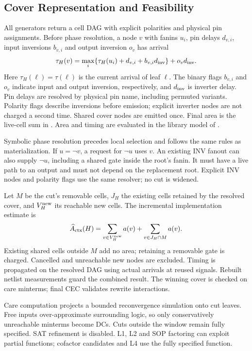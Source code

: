 \subsection{Cover Representation and Feasibility}
All generators return a cell DAG with explicit polarities and physical pin assignments. Before phase resolution, a node $v$ with fanins $u_i$, pin delays $d_{v,i}$, input inversions $b_{v,i}$ and output inversion $o_v$ has arrival
\begin{equation}
 \tau_H(v)=\max_i\{\tau_H(u_i)+d_{v,i}+b_{v,i}d_{\rm inv}\}
                  +o_vd_{\rm inv}.\label{eq:delay}
\end{equation}
Here $\tau_H(\ell)=\tau(\ell)$ is the current arrival of leaf $\ell$. The binary flags $b_{v,i}$ and $o_v$ indicate input and output inversion, respectively, and $d_{\rm inv}$ is inverter delay. Pin delays are resolved by physical pin name, including permuted variants. Polarity flags describe inversions before emission; explicit inverter nodes are not charged a second time. Shared cover nodes are emitted once. Final area is the live-cell sum in . Area and timing are evaluated in the library model of .

Symbolic phase resolution precedes local selection and follows the same rules as materialization. If $u=\neg v$, a request for $\neg u$ uses $v$. An existing INV fanout can also supply $\neg u$, including a shared gate inside the root's fanin. It must have a live path to an output and must not depend on the replacement root. Explicit INV nodes and polarity flags use the same resolver; no cut is widened.

Let $M$ be the cut's removable cells, $J_H$ the existing cells retained by the resolved cover, and $V_H^{\rm new}$ its reachable new cells. The incremental implementation estimate is
\begin{equation}
 \widehat A_{\rm ctx}(H)=\sum_{v\in V_H^{\rm new}}a(v)+\sum_{v\in J_H\cap M}a(v).\label{eq:context_area}
\end{equation}
Existing shared cells outside $M$ add no area; retaining a removable gate is charged. Cancelled and unreachable new nodes are excluded. Timing is propagated on the resolved DAG using actual arrivals at reused signals. Rebuilt netlist measurements guard the combined result. The winning cover is checked on care minterms; final CEC validates rewrite interactions.

Care computation projects a bounded reconvergence simulation onto cut leaves. Free inputs over-approximate surrounding logic, so only conservatively unreachable minterms become DCs. Cuts outside the window remain fully specified. SAT refinement is disabled. L1, L2 and SOP factoring can exploit partial functions; cofactor candidates and L4 use the fully specified function.


